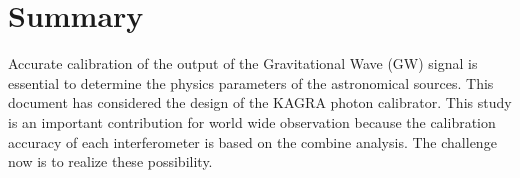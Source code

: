 
\chapter{Summary} %

\label{Chapter8} %
Accurate calibration of the output of the Gravitational Wave (GW) signal is 
essential to determine the physics parameters of the astronomical sources. 
This document has considered the design of the KAGRA photon calibrator.
This study is an important contribution for world wide observation because the calibration accuracy of each interferometer is based on the combine analysis. 
The challenge now is to realize these possibility.

